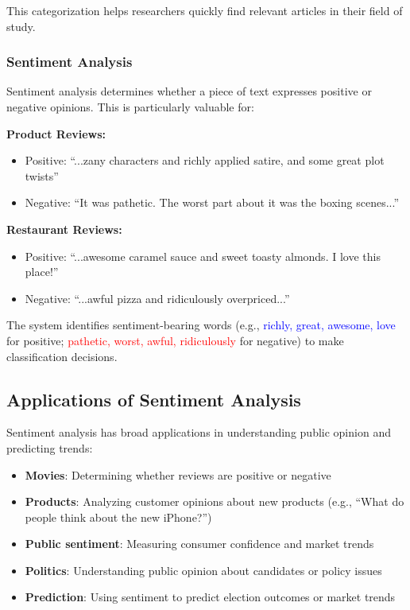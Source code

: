 \documentclass[11pt,a4paper]{article}
\theoremstyle{definition}
\theoremstyle{plain}
\theoremstyle{remark}
\begin{document}
This categorization helps researchers quickly find relevant articles in their field of study.

\subsubsection{Sentiment Analysis}

Sentiment analysis determines whether a piece of text expresses positive or negative opinions. This is particularly valuable for:

\textbf{Product Reviews:}
\begin{itemize}
    \item Positive: ``...zany characters and richly applied satire, and some great plot twists''
    \item Negative: ``It was pathetic. The worst part about it was the boxing scenes...''
\end{itemize}

\textbf{Restaurant Reviews:}
\begin{itemize}
    \item Positive: ``...awesome caramel sauce and sweet toasty almonds. I love this place!''
    \item Negative: ``...awful pizza and ridiculously overpriced...''
\end{itemize}

The system identifies sentiment-bearing words (e.g., \textcolor{blue}{richly, great, awesome, love} for positive; \textcolor{red}{pathetic, worst, awful, ridiculously} for negative) to make classification decisions.

\subsection{Applications of Sentiment Analysis}

Sentiment analysis has broad applications in understanding public opinion and predicting trends:

\begin{itemize}
    \item \textbf{Movies}: Determining whether reviews are positive or negative
    \item \textbf{Products}: Analyzing customer opinions about new products (e.g., ``What do people think about the new iPhone?'')
    \item \textbf{Public sentiment}: Measuring consumer confidence and market trends
    \item \textbf{Politics}: Understanding public opinion about candidates or policy issues
    \item \textbf{Prediction}: Using sentiment to predict election outcomes or market trends
\end{itemize}
\end{document}
